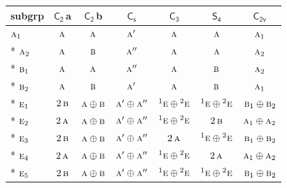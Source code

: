 \documentclass[10pt,a4paper]{article}
\numberwithin{equation}{section}
\newcommand{\grp}[1]{\mathsf{#1}}
\newcommand{\irr}[1]{\text{\normalfont\scshape #1}}
\newcommand{\conjpair}[1]{{}^{#1}}
\newcommand{\clsletter}[1]{\,{\scriptsize\color{black!55}#1}}
\begin{document}
{\small\begin{longtable}{@{}lcccccc@{}}\toprule
subgrp & \href{C2.pdf}{$\grp{C_{2}}$}\clsletter{a} & \href{C2.pdf}{$\grp{C_{2}}$}\clsletter{b} & \href{C1v.pdf}{$\grp{C_{s}}$} & \href{C3.pdf}{$\grp{C_{3}}$} & \href{S4.pdf}{$\grp{S_{4}}$} & \href{C2v.pdf}{$\grp{C_{2v}}$}\\\midrule\endhead
\bottomrule\endfoot\endlastfoot
$\irr{a}_{1}$ & $\irr{a}$ & $\irr{a}$ & $\irr{a}'$ & $\irr{a}$ & $\irr{a}$ & $\irr{a}_{1}$\\*
$\irr{a}_{2}$ & $\irr{a}$ & $\irr{b}$ & $\irr{a}''$ & $\irr{a}$ & $\irr{a}$ & $\irr{a}_{2}$\\*
$\irr{b}_{1}$ & $\irr{a}$ & $\irr{a}$ & $\irr{a}''$ & $\irr{a}$ & $\irr{b}$ & $\irr{a}_{2}$\\*
$\irr{b}_{2}$ & $\irr{a}$ & $\irr{b}$ & $\irr{a}'$ & $\irr{a}$ & $\irr{b}$ & $\irr{a}_{1}$\\*
$\irr{e}_{1}$ & $2\,\irr{b}$ & $\irr{a}\oplus \irr{b}$ & $\irr{a}'\oplus \irr{a}''$ & $\conjpair{1}\irr{e}\oplus \conjpair{2}\irr{e}$ & $\conjpair{1}\irr{e}\oplus \conjpair{2}\irr{e}$ & $\irr{b}_{1}\oplus \irr{b}_{2}$\\*
$\irr{e}_{2}$ & $2\,\irr{a}$ & $\irr{a}\oplus \irr{b}$ & $\irr{a}'\oplus \irr{a}''$ & $\conjpair{1}\irr{e}\oplus \conjpair{2}\irr{e}$ & $2\,\irr{b}$ & $\irr{a}_{1}\oplus \irr{a}_{2}$\\*
$\irr{e}_{3}$ & $2\,\irr{b}$ & $\irr{a}\oplus \irr{b}$ & $\irr{a}'\oplus \irr{a}''$ & $2\,\irr{a}$ & $\conjpair{1}\irr{e}\oplus \conjpair{2}\irr{e}$ & $\irr{b}_{1}\oplus \irr{b}_{2}$\\*
$\irr{e}_{4}$ & $2\,\irr{a}$ & $\irr{a}\oplus \irr{b}$ & $\irr{a}'\oplus \irr{a}''$ & $\conjpair{1}\irr{e}\oplus \conjpair{2}\irr{e}$ & $2\,\irr{a}$ & $\irr{a}_{1}\oplus \irr{a}_{2}$\\*
$\irr{e}_{5}$ & $2\,\irr{b}$ & $\irr{a}\oplus \irr{b}$ & $\irr{a}'\oplus \irr{a}''$ & $\conjpair{1}\irr{e}\oplus \conjpair{2}\irr{e}$ & $\conjpair{1}\irr{e}\oplus \conjpair{2}\irr{e}$ & $\irr{b}_{1}\oplus \irr{b}_{2}$\\
\bottomrule\end{longtable}}
\end{document}
